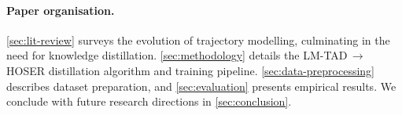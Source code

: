 \paragraph{Paper organisation.}  \autoref{sec:lit-review} surveys the evolution of trajectory modelling, culminating in the need for knowledge distillation.  \autoref{sec:methodology} details the LM-TAD\,$\rightarrow$\,HOSER distillation algorithm and training pipeline.  \autoref{sec:data-preprocessing} describes dataset preparation, and \autoref{sec:evaluation} presents empirical results.  We conclude with future research directions in \autoref{sec:conclusion}.

